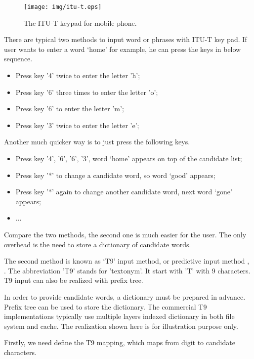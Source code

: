 \documentclass[b5paper]{article}
\begin{document}
\begin{figure}[htbp]
  \centering
  \texttt{[image: img/itu-t.eps]}
  \caption{The ITU-T keypad for mobile phone.}
  \label{fig:itut-keypad}
\end{figure}

There are typical two methods to input word or phrases with ITU-T key pad.
If user wants to enter a word `home' for example, he can press the keys
in below sequence.

\begin{itemize}
\item Press key '4' twice to enter the letter 'h';
\item Press key '6' three times to enter the letter 'o';
\item Press key '6' to enter the letter 'm';
\item Press key '3' twice to enter the letter 'e';
\end{itemize}

Another much quicker way is to just press the following keys.

\begin{itemize}
\item Press key '4', '6', '6', '3', word `home' appears on top of the candidate list;
\item Press key '*' to change a candidate word, so word `good' appears;
\item Press key '*' again to change another candidate word, next word `gone' appears;
\item ...
\end{itemize}

Compare the two methods, the second one is much easier for the user.
The only overhead is the need to store a dictionary of candidate words.

The second method is known as `T9' input method, or predictive input method
\cite{wiki-t9}, \cite {wiki-predictive-text}. The abbreviation 'T9' stands
for 'textonym'. It start with 'T' with 9 characters. T9 input can also be
realized with prefix tree.

In order to provide candidate words, a dictionary must be prepared
in advance. Prefix tree can be used to store the dictionary. The
commercial T9 implementations typically use multiple layers indexed dictionary in
both file system and cache. The realization shown here is for illustration
purpose only.

Firstly, we need define the T9 mapping, which maps from digit to candidate
characters.
\end{document}

